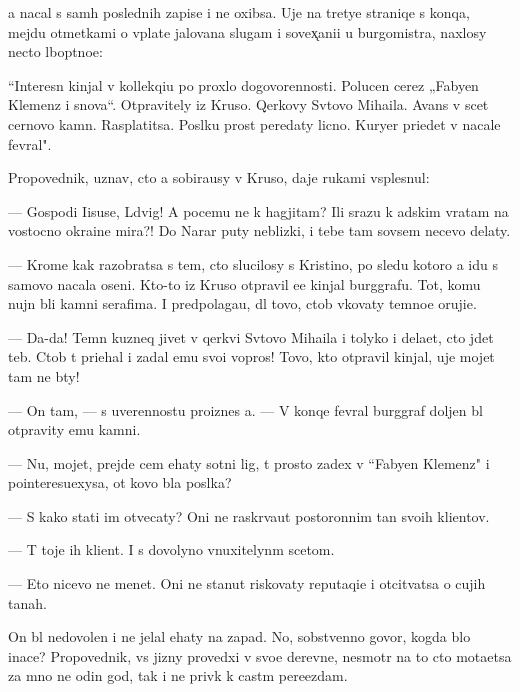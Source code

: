 \documentclass[10pt]{book}
\begin{document}
{\Y}a nacal s sam{\yi}h poslednih zapise{\y} i ne oxibsa. Uje na tretye{\y} straniqe s konqa, mejdu otmetkami o v{\yi}plate jalovan{\y}a slugam i sovex̨ani{\y}i u burgomistra, naxlosy necto l{\iu}bop{\yi}tno{\y}e:

``Interesn{\yi}{\y} kinjal v kollekqi{\y}u po proxlo{\y} dogovorennosti. Polucen cerez „Fabyen Klemenz i s{\yi}nov{\y}a“. Otpravitely iz Kruso. Qerkovy Sv{\ia}tovo Miha{\y}ila. Avans v scet cernovo kamn{\ia}. Rasplatitsa. Pos{\yi}lku pros{\ia}t peredaty licno. Kuryer pri{\y}edet v nacale fevral{\ia}".



Propovednik, uznav, cto {\y}a sobira{\y}usy v Kruso, daje rukami vsplesnul:

— Gospodi Iisuse, L{\iu}dvig! A pocemu ne k hagjitam? Ili srazu k adskim vratam na vostocno{\y} okra{\y}ine mira?! Do Narar{\yi} puty neblizki{\y}, i tebe tam sovsem necevo delaty.

— Krome kak razobratsa s tem, cto slucilosy s Kristino{\y}, po sledu kotoro{\y} {\y}a idu s samovo nacala oseni. Kto-to iz Kruso otpravil {\y}e{\y}e kinjal burggrafu. Tot, komu nujn{\yi} b{\yi}li kamni serafima. I predpolaga{\y}u, dl{\ia} tovo, ctob{\yi} v{\yi}kovaty temno{\y}e oruji{\y}e.

— Da-da! Temn{\yi}{\y} kuzneq jivet v qerkvi Sv{\ia}tovo Miha{\y}ila i tolyko i dela{\y}et, cto jdet teb{\ia}. Ctob{\yi} t{\yi} pri{\y}ehal i zadal {\y}emu svo{\y}i vopros{\yi}! Tovo, kto otpravil kinjal, uje mojet tam ne b{\yi}ty!

— On tam, — s uverennost{\y}u pro{\y}iznes {\y}a. — V konqe fevral{\ia} burggraf doljen b{\yi}l otpravity {\y}emu kamni.

— Nu, mojet, prejde cem {\y}ehaty sotni lig, t{\yi} prosto za{\y}dex v ``Fabyen Klemenz" i po{\y}interesu{\y}exysa, ot kovo b{\yi}la pos{\yi}lka?

— S kako{\y} stati im otvecaty? Oni ne raskr{\yi}va{\y}ut postoronnim ta{\y}n{\yi} svo{\y}ih kli{\y}entov.

— T{\yi} toje ih kli{\y}ent. I s dovolyno vnuxitelyn{\yi}m scetom.

— Eto nicevo ne men{\ia}{\y}et. Oni ne stanut riskovaty reputaqi{\y}e{\y} i otcit{\yi}vatsa o cujih ta{\y}nah.

On b{\yi}l nedovolen i ne jelal {\y}ehaty na zapad. No, sobstvenno govor{\ia}, kogda b{\yi}lo inace? Propovednik, vs{\iu} jizny provedxi{\y} v svo{\y}e{\y} derevne, nesmotr{\ia} na to cto mota{\y}etsa za mno{\y} ne odin god, tak i ne priv{\yi}k k cast{\yi}m pere{\y}ezdam.
\end{document}
